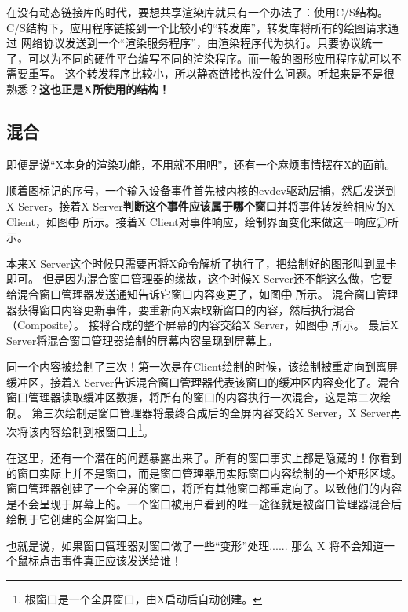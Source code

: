 在没有动态链接库的时代，要想共享渲染库就只有一个办法了：使用C/S结构。C/S结构下，应用程序链接到一个比较小的“转发库”，转发库将所有的绘图请求通过
网络协议发送到一个“渲染服务程序”，由渲染程序代为执行。只要协议统一了，可以为不同的硬件平台编写不同的渲染程序。而一般的图形应用程序就可以不需要重写。
这个转发程序比较小，所以静态链接也没什么问题。听起来是不是很熟悉？\textbf{这也正是X所使用的结构！}

\subsection{混合}

即便是说“X本身的渲染功能，不用就不用吧”，还有一个麻烦事情摆在X的面前。


顺着图\thefigure{}标记的序号，一个输入设备事件首先被内核的evdev驱动层捕，然后发送到X Server。接着X Server\textbf{判断这个事件应该属于哪个窗口}并将事件转发给相应的X Client，如图中\textcircled{} 所示。接着X Client对事件响应，绘制界面变化来做这一响应，\textcircled{}所示。

本来X Server这个时候只需要再将X命令解析了执行了，把绘制好的图形叫到显卡即可。
但是因为混合窗口管理器的缘故，这个时候X Server还不能这么做，它要给混合窗口管理器发送通知告诉它窗口内容变更了，如图中\textcircled{} 所示。
混合窗口管理器获得窗口内容更新事件，要重新向X索取新窗口的内容，然后执行混合（Composite）。
接将合成的整个屏幕的内容交给X Server，如图中\textcircled{} 所示。
最后X Server将混合窗口管理器绘制的屏幕内容呈现到屏幕上。

同一个内容被绘制了三次！第一次是在Client绘制的时候，该绘制被重定向到离屏缓冲区，接着X Server告诉混合窗口管理器代表该窗口的缓冲区内容变化了。混合窗口管理器读取缓冲区数据，将所有的窗口的内容执行一次混合，这是第二次绘制。
第三次绘制是窗口管理器将最终合成后的全屏内容交给X Server，X Server再次将该内容绘制到根窗口上\footnote{根窗口是一个全屏窗口，由X启动后自动创建。}。

在这里，还有一个潜在的问题暴露出来了。所有的窗口事实上都是隐藏的！你看到的窗口实际上并不是窗口，而是窗口管理器用实际窗口内容绘制的一个矩形区域。
窗口管理器创建了一个全屏的窗口，将所有其他窗口都重定向了。以致他们的内容是不会呈现于屏幕上的。一个窗口被用户看到的唯一途径就是被窗口管理器混合后绘制于它创建的全屏窗口上。

也就是说，如果窗口管理器对窗口做了一些“变形”处理...... 那么 X 将不会知道一个鼠标点击事件真正应该发送给谁！

